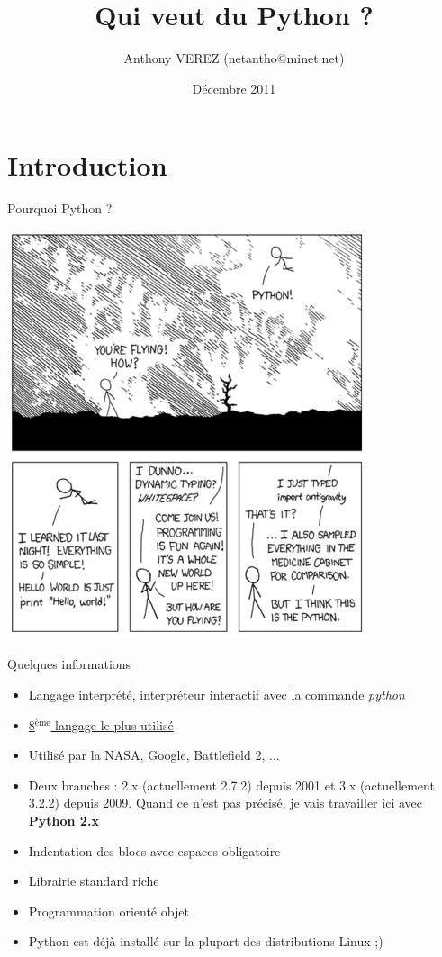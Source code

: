 \documentclass{beamer}
\title{Qui veut du Python ?}
\author{Anthony VEREZ (netantho@minet.net)}
\date{Décembre 2011}
\begin{document}
\begin{frame}
\titlepage
\end{frame}

\section{Introduction}

\begin{frame}{Pourquoi Python ?}
 \begin{center}
 \includegraphics[scale=0.3]{./Python_cartoon.png}
\end{center}

\end{frame}

\begin{frame}{Quelques informations}
\begin{itemize}
 \item Langage interprété, interpréteur interactif avec la commande \textit{python}
 \item \href{http://www.tiobe.com/index.php/content/paperinfo/tpci/index.html}{8$^{\text{ème}}$ langage le plus utilisé}
 \item Utilisé par la NASA, Google, Battlefield 2, ...
 \item Deux branches : 2.x (actuellement 2.7.2) depuis 2001 et 3.x (actuellement 3.2.2) depuis 2009. Quand ce n'est pas précisé, je vais travailler ici avec \textbf{Python 2.x}
 \item Indentation des blocs avec espaces obligatoire
 \item Librairie standard riche
 \item Programmation orienté objet
 \item Python est déjà installé sur la plupart des distributions Linux ;)
\end{itemize}
\end{frame}
\end{document}
